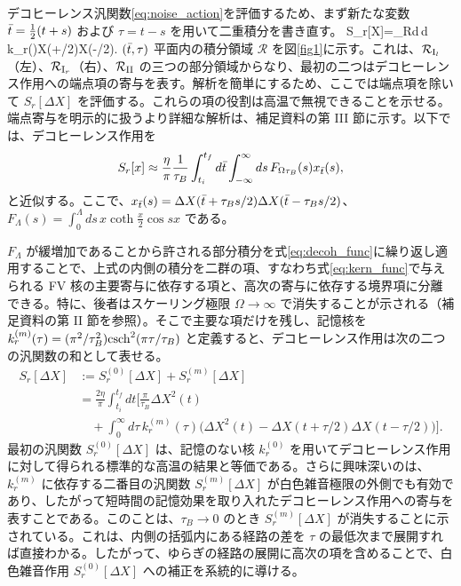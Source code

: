 デコヒーレンス汎関数\eqref{eq:noise_action}を評価するため、まず新たな変数 $\bar{t}=\frac12(t+s)$ および $\tau=t-s$ を用いて二重積分を書き直す。
\be\label{eq:decoh_action}
S_r[\Delta X]=\iint_{\mathcal R}d\tb\,d\tau\,k_r(\tau)\Delta X(\tb+\tau/2)\Delta X(\tb-\tau/2).
\ee
$(\bar{t},\tau)$ 平面内の積分領域 $\mathcal R$ を図\ref{fig1}に示す。これは、$\mathcal R_{{\rm I}_l}$（左）、$\mathcal R_{{\rm I}_r}$（右）、$\mathcal R_{\rm II}$ の三つの部分領域からなり、最初の二つはデコヒーレンス作用への端点項の寄与を表す。解析を簡単にするため、ここでは端点項を除いて $S_r[\Delta X]$ を評価する。これらの項の役割は高温で無視できることを示せる。端点寄与を明示的に扱うより詳細な解析は、補足資料\cite{SuppMat}の第 III 節に示す。以下では、デコヒーレンス作用を
\begin{equation}\label{eq:decoh_func}
S_r[x]\approx\frac\eta\pi\frac1{\tau_B}\int_{t_i}^{t_f}d\bar{t}\int_{-\infty}^{\infty}ds\,F_{\Omega\tau_B}(s)x_{\bar{t}}(s),
\end{equation}
と近似する。ここで、$x_{\bar{t}}(s)=\Delta X(\bar{t}+\tau_Bs/2)\Delta X(\bar{t}-\tau_Bs/2)$、$F_\Lambda(s)=\int_0^\Lambda ds\,x\coth\frac x2\cos sx$ である。

$F_\Lambda$ が緩増加であることから許される部分積分を式\eqref{eq:decoh_func}に繰り返し適用することで、上式の内側の積分を二群の項、すなわち式\eqref{eq:kern_func}で与えられる FV 核の主要寄与に依存する項と、高次の寄与に依存する境界項に分離できる。特に、後者はスケーリング極限 $\Omega\to\infty$ で消失することが示される（補足資料\cite{SuppMat}の第 II 節を参照）。そこで主要な項だけを残し、記憶核を $k_r^{(m)}(\tau)=(\pi^2/\tau_B^2){\rm csch}^2(\pi\tau/\tau_B)$ と定義すると、デコヒーレンス作用は次の二つの汎関数の和として表せる。
\begin{align}\label{eq:action}
S_r[\Delta X]&:=S_r^{(0)}[\Delta X]+S_r^{(m)}[\Delta X]\nonumber\\
&=\frac{2\eta}{\pi}\int_{t_i}^{t_f}dt\bigg[\frac\pi{\tau_B}\Delta X^2(t)\nonumber\\
&\quad+\int_0^\infty d\tau\,k_r^{(m)}(\tau)\big(\Delta X^2(t)-\Delta X(t+\tau/2)\Delta X(t-\tau/2)\big)\bigg].
\end{align}
最初の汎関数 $S_r^{(0)}[\Delta X]$ は、記憶のない核 $k_r^{(0)}$ を用いてデコヒーレンス作用に対して得られる標準的な高温の結果と等価である。さらに興味深いのは、$k_r^{(m)}$ に依存する二番目の汎関数 $S_r^{(m)}[\Delta X]$ が白色雑音極限の外側でも有効であり、したがって短時間の記憶効果を取り入れたデコヒーレンス作用への寄与を表すことである。このことは、$\tau_B\to0$ のとき $S_r^{(m)}[\Delta X]$ が消失することに示されている。これは、内側の括弧内にある経路の差を $\tau$ の最低次まで展開すれば直接わかる。したがって、ゆらぎの経路の展開に高次の項を含めることで、白色雑音作用 $S_r^{(0)}[\Delta X]$ への補正を系統的に導ける。


